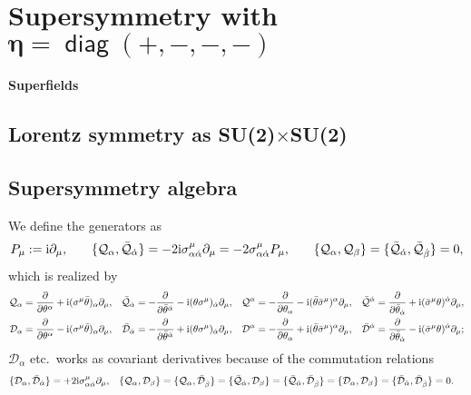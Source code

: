 \documentclass[CheatSheet]{subfiles}
\newcommand{\OQ}{{\mathcal Q}}
\newcommand{\OD}{{\mathcal D}}
\begin{document}
\summarystyle
\section[Supersymmetry with $\eta=\diag(+,-,-,-)$]{Supersymmetry with $\bm{\eta=\mathop{\mathsf{diag}}(+,-,-,-)}$}



\paragraph{Superfields}


\clearpage
\detailstyle

\subsection{Lorentz symmetry as SU(2)$\times$SU(2)}


\subsection{Supersymmetry algebra}
We define the generators as
\begin{alignat}{3}
 P_\mu
 &:= \ii\partial_\mu,
\quad&
 \{\OQ_\alpha, \bar \OQ_\dalpha\}
 &= -2\ii\sigma^{\mu}_{\alpha\dalpha}\partial_\mu = -2\sigma^{\mu}_{\alpha\dalpha}P_\mu,
\quad&
  \{\OQ_\alpha, \OQ_\beta\} =   \{\bar \OQ_\dalpha, \bar \OQ_\dbeta\} = 0,
\end{alignat}
which is realized by
\begin{align*}
\OQ_\alpha &= \frac{\partial}{\partial \theta^{\alpha}}+\ii (\sigma^{\mu}\btheta){}_{\alpha}\partial_{\mu},
&
\bar \OQ_\dalpha&=-\frac{\partial}{\partial \btheta^{\dalpha}}-\ii (\theta \sigma^{\mu}){}_{\dalpha}\partial_{\mu},
&
\OQ^\alpha&=-\frac{\partial}{\partial \theta_{\alpha}}-\ii (\btheta\bsigma^{\mu})^{\alpha}\partial_{\mu},
&
\bar \OQ^{\dalpha}&=\frac{\partial}{\partial \btheta_{\dalpha}}+\ii (\bsigma^{\mu}\theta)^{\dalpha}\partial_{\mu},
\\
\OD_\alpha&=\frac{\partial}{\partial \theta^{\alpha}}-\ii (\sigma^{\mu}\btheta){}_{\alpha}\partial_{\mu},
&
\bar \OD_\dalpha&=-\frac{\partial}{\partial \btheta^{\dalpha}}+\ii (\theta \sigma^{\mu}){}_{\dalpha}\partial_{\mu},
&
\OD^\alpha&=-\frac{\partial}{\partial \theta_{\alpha}}+\ii (\btheta\bsigma^{\mu})^{\alpha}\partial_{\mu},
&
\bar \OD^\dalpha&=\frac{\partial}{\partial \btheta_{\dalpha}}-\ii (\bsigma^{\mu}\theta)^{\dalpha}\partial_{\mu};
\end{align*}
$\OD_\alpha$ etc.~works as covariant derivatives because of the commutation relations
\begin{align*}
\{\OD_\alpha, \bar \OD_\dalpha\}&=+2\ii\sigma^{\mu}_{\alpha\dalpha}\partial_\mu,&
\{\OQ_\alpha, \OD_\beta\}&=
\{\OQ_\alpha, \bar \OD_\dbeta\}=
\{\bar \OQ_\dalpha, \OD_\beta\}=
\{\bar \OQ_\dalpha, \bar \OD_\dbeta\}=
\{\OD_\alpha, \OD_\beta\}=
\{\bar \OD_\dalpha, \bar \OD_\dbeta\}=0.
\end{align*}
\end{document}
